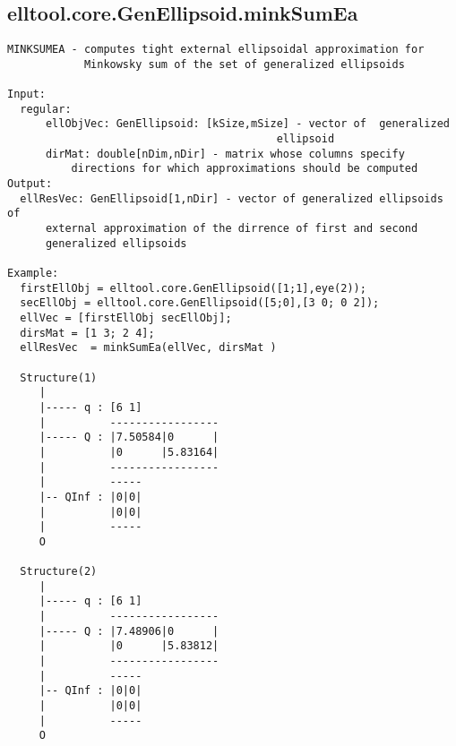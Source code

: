 \subsection{\texorpdfstring{elltool.core.GenEllipsoid.minkSumEa}{minkSumEa}}\label{method:elltool.core.GenEllipsoid.minkSumEa}
\begin{verbatim}
MINKSUMEA - computes tight external ellipsoidal approximation for
            Minkowsky sum of the set of generalized ellipsoids

Input:
  regular:
      ellObjVec: GenEllipsoid: [kSize,mSize] - vector of  generalized
                                          ellipsoid
      dirMat: double[nDim,nDir] - matrix whose columns specify
          directions for which approximations should be computed
Output:
  ellResVec: GenEllipsoid[1,nDir] - vector of generalized ellipsoids of
      external approximation of the dirrence of first and second
      generalized ellipsoids

Example:
  firstEllObj = elltool.core.GenEllipsoid([1;1],eye(2));
  secEllObj = elltool.core.GenEllipsoid([5;0],[3 0; 0 2]);
  ellVec = [firstEllObj secEllObj];
  dirsMat = [1 3; 2 4];
  ellResVec  = minkSumEa(ellVec, dirsMat )

  Structure(1)
     |
     |----- q : [6 1]
     |          -----------------
     |----- Q : |7.50584|0      |
     |          |0      |5.83164|
     |          -----------------
     |          -----
     |-- QInf : |0|0|
     |          |0|0|
     |          -----
     O

  Structure(2)
     |
     |----- q : [6 1]
     |          -----------------
     |----- Q : |7.48906|0      |
     |          |0      |5.83812|
     |          -----------------
     |          -----
     |-- QInf : |0|0|
     |          |0|0|
     |          -----
     O
\end{verbatim}
